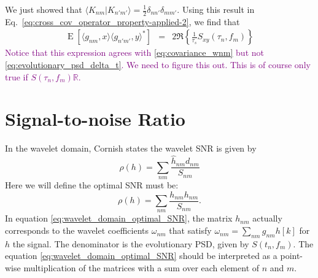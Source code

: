 \documentclass{article}
\begin{document}
We just showed that $ \langle K_{nm} |  K_{n'm'} \rangle = \frac{1}{2}\delta_{nn'} \delta_{mm'}$. Using this result in Eq.~\eqref{eq:cross_cov_operator_property-applied-2}, we find that
\begin{eqnarray}
\label{eq:cross_cov_operator_property-applied-3}
\operatorname{E}\left[ \langle g_{nm} , x \rangle \langle g_{n'm'}, y \rangle^{\ast} \right]  
    &=& 2 \Re\left\{ \frac{1}{\tau_s}  S_{xy}(\tau_n, f_m) \right\}
\end{eqnarray}
\textcolor{purple}{Notice that this expression agrees with \eqref{eq:covariance_wnm} but not \eqref{eq:evolutionary_psd_delta_t}. We need to figure this out. This is of course only true if $S(\tau_{n},f_{m})\mathbb{R}$.}


\section{Signal-to-noise Ratio}

In the wavelet domain, Cornish states the wavelet SNR is given by
\begin{equation}
    \rho(h) = \sum_{nm} \frac{\hat{h}_{nm}d_{nm}}{S_{nm}}
\end{equation}
Here we will define the optimal SNR must be:
\begin{equation}\label{eq:wavelet_domain_optimal_SNR}
    \rho(h) = \sum_{nm} \frac{h_{nm}h_{nm}}{S_{nm}}.
\end{equation}
In equation \eqref{eq:wavelet_domain_optimal_SNR}, the matrix $h_{nm}$ actually corresponds to the wavelet coefficients $\omega_{nm}$ that satisfy $\omega_{nm} = \sum_{nm}g_{nm}h[k]$ for $h$ the signal. The denominator is the evolutionary PSD, given by $S(t_{n},f_{m})$. The equation \eqref{eq:wavelet_domain_optimal_SNR} should be interpreted as a point-wise multiplication of the matrices with a sum over each element of $n$ and $m$. 
\end{document}
